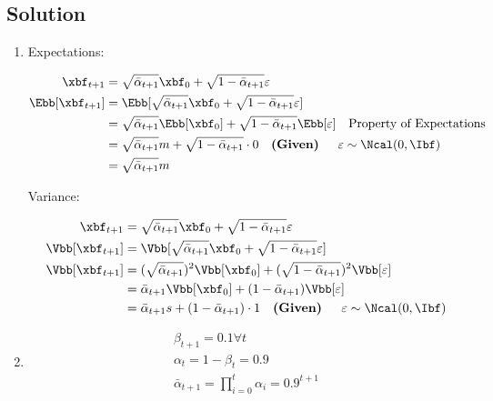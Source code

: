 \documentclass[12pt, xcolor=dvipsnames,svgnames,x11names]{article}
\begin{document}
\newpage

\subsection*{Solution}

\begin{enumerate}
\item 

Expectations:

\begin{align*}
\xbf_{t+1} & = \sqrt{\bar{\alpha}_{t+1}}\xbf_0 + \sqrt{1 - \bar{\alpha}_{t+1}}\varepsilon\\
\Ebb[\xbf_{t+1}] & = \Ebb[ \sqrt{\bar{\alpha}_{t+1}}\xbf_0 + \sqrt{1 - \bar{\alpha}_{t+1}}\varepsilon]\\
 & = \sqrt{\bar{\alpha}_{t+1}} \Ebb[\xbf_0] +  \sqrt{1 - \bar{\alpha}_{t+1}} \Ebb[\varepsilon] \quad \text{Property of Expectations}\\
  & = \sqrt{\bar{\alpha}_{t+1}}  m +  \sqrt{1 - \bar{\alpha}_{t+1}}\cdot 0 \quad \textbf{(Given)~~~~} \varepsilon \sim \Ncal (0, \Ibf) \\
& =  \sqrt{\bar{\alpha}_{t+1}}  m
\end{align*}


Variance:

\begin{align*}
\xbf_{t+1} & = \sqrt{\bar{\alpha}_{t+1}}\xbf_0 + \sqrt{1 - \bar{\alpha}_{t+1}}\varepsilon\\
\Vbb[\xbf_{t+1}] & = \Vbb[ \sqrt{\bar{\alpha}_{t+1}}\xbf_0 + \sqrt{1 - \bar{\alpha}_{t+1}}\varepsilon]\\
\Vbb[\xbf_{t+1}] & = ( \sqrt{\bar{\alpha}_{t+1}}) ^2 \Vbb[\xbf_0] + ( \sqrt{1 - \bar{\alpha}_{t+1}} )^2 \Vbb[\varepsilon]\\
& = \bar{\alpha}_{t+1} \Vbb[\xbf_0] + (1 - \bar{\alpha}_{t+1} )\Vbb[\varepsilon]\\
& = \bar{\alpha}_{t+1}  s +  (1 - \bar{\alpha}_{t+1} )\cdot 1  \quad \textbf{(Given)~~~~} \varepsilon \sim \Ncal (0, \Ibf) 
\end{align*}


\item 

\begin{align*}
\beta_{t+1} = 0.1 \forall t\\
\alpha_t = 1 - \beta_t = 0.9\\
\bar{\alpha}_{t+1} = \prod_{i=0}^t \alpha_i = 0.9^{t+1}
\end{align*}



\end{enumerate}
\end{document}
